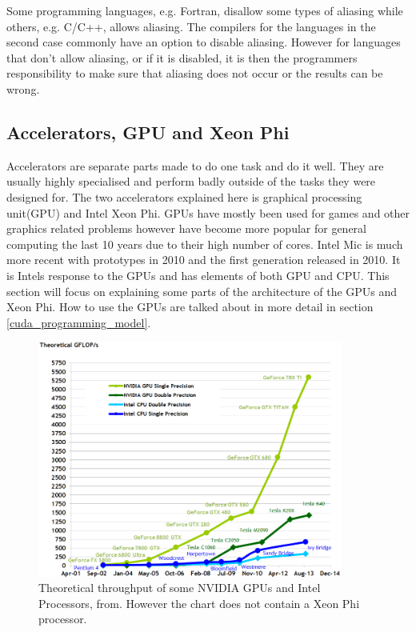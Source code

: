 \documentclass[10pt,a4paper]{report}
\begin{document}
Some programming languages, e.g. Fortran, disallow some types of aliasing while others, e.g. C/C++, allows aliasing\cite{introduction_hpc_hager}. The compilers for the languages in the second case commonly have an option to disable aliasing. However for languages that don't allow aliasing, or if it is disabled, it is then the programmers responsibility to make sure that aliasing does not occur or the results can be wrong\cite{introduction_hpc_hager}.

\subsection{Accelerators, GPU and Xeon Phi}
\label{gpu}
Accelerators are separate parts made to do one task and do it well. They are usually highly specialised and perform badly outside of the tasks they were designed for. The two accelerators explained here is graphical processing unit(GPU) and Intel Xeon Phi\cite{cuda, jeffers2013intel}. GPUs have mostly been used for games and other graphics related problems however have become more popular for general computing the last 10 years due to their high number of cores\cite{cuda}.  Intel Mic is much more recent with prototypes in 2010 and the first generation released in 2010\cite{jeffers2013intel}. It is Intels response to the GPUs and has elements of both GPU and CPU\cite{jeffers2013intel}. This section will focus on explaining some parts of the architecture of the GPUs and Xeon Phi. How to use the GPUs are talked about in more detail in section \ref{cuda_programming_model}.

\begin{figure}[h]
    \centering
    \includegraphics[width=10cm]{floating-point-operations-per-second.png}
    \caption{Theoretical throughput of some NVIDIA GPUs and Intel Processors, from\cite{cuda}. However the chart does not contain a Xeon Phi processor.}
    \label{fig:gpu_vs_cpu}
\end{figure}
\end{document}
